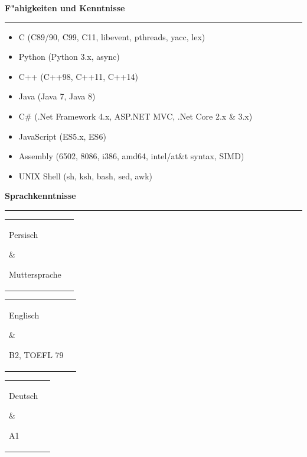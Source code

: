 \documentclass[11pt,a4paper,oneside]{article}
\makeatletter
\renewcommand{\section}[1]{%
{\large\textbf{#1}}\\
\rule[9pt]{18cm}{.4pt}\vspace{-16pt}%
}
\newenvironment{mytable}{%
\begin{tabular}{@{}l@{\hspace{4mm}}l@{}}%
}{\end{tabular}}
\newcommand{\myitem}[2]{%
\parbox[t]{16mm}{#1}&\parbox[t]{16cm}{#2}\\%
}
\makeatother
\begin{document}
\section{F"ahigkeiten und Kenntnisse}
\begin{itemize}
\item C (C89/90, C99, C11, libevent, pthreads, yacc, lex)
\item Python (Python 3.x, async)
\item C++ (C++98, C++11, C++14)
\item Java (Java 7, Java 8)
\item C\# (.Net Framework 4.x, ASP.NET MVC, .Net Core 2.x \& 3.x)
\item JavaScript (ES5.x, ES6)
\item Assembly (6502, 8086, i386, amd64, intel/at\&t syntax, SIMD)
\item UNIX Shell (sh, ksh, bash, sed, awk)
\end{itemize}

\section{Sprachkenntnisse}

\begin{mytable}\myitem{Persisch}{
	Muttersprache
}\end{mytable}

\begin{mytable}\myitem{Englisch}{
	B2, TOEFL 79
}\end{mytable}

\begin{mytable}\myitem{Deutsch}{
	A1
}\end{mytable}
\end{document}
